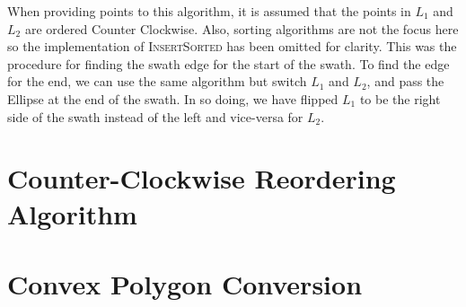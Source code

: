 When providing points to this algorithm, it is assumed that the points in $L_1$
and $L_2$ are ordered Counter Clockwise. Also, sorting algorithms are not the
focus here so the implementation of \textsc{InsertSorted} has been omitted for
clarity.  This was the procedure for finding the swath edge for the start of
the swath.  To find the edge for the end, we can use the same algorithm but
switch $L_1$ and $L_2$, and pass the Ellipse at the end of the swath. In so
doing, we have flipped $L_1$ to be the right side of the swath instead of the
left and vice-versa for $L_2$. 




\section{Counter-Clockwise Reordering Algorithm} \label{alg:ccw}


\section{Convex Polygon Conversion} \label{alg:force-complex}

